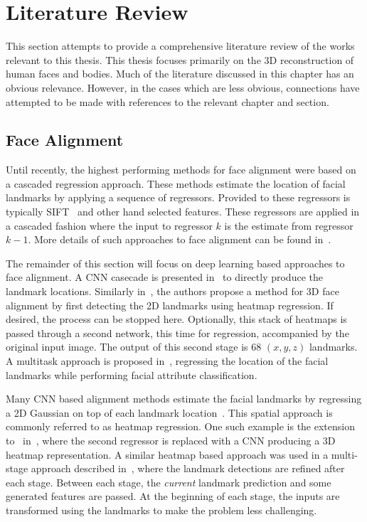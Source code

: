  \chapter{Literature Review}


This section attempts to provide a comprehensive literature review of
the works relevant to this thesis. This thesis focuses primarily on
the 3D reconstruction of human faces and bodies. Much of the
literature discussed in this chapter has an obvious
relevance. However, in the cases which are less obvious, connections
have attempted to be made with references to the relevant chapter and
section.

\section{Face Alignment}

Until recently, the highest performing methods for face alignment were
based on a cascaded regression approach. These methods estimate the
location of facial landmarks by applying a sequence of
regressors. Provided to these regressors is typically
SIFT~\cite{lowe2004distinctive} and other hand selected
features. These regressors are applied in a cascaded fashion where the
input to regressor $k$ is the estimate from regressor $k-1$. More
details of such approaches to face alignment can be found
in~\cite{sanchez16,cao2014facewarehouse,xiongsupervised,zhu2015face,tzimiropoulos2015project}.

The remainder of this section will focus on deep learning based
approaches to face alignment. A CNN casecade is presented
in~\cite{sun2013deep} to directly produce the landmark
locations. Similarly in~\cite{bulat2016two}, the authors propose a
method for 3D face alignment by first detecting the 2D landmarks using
heatmap regression. If desired, the process can be stopped
here. Optionally, this stack of heatmaps is passed through a second
network, this time for regression, accompanied by the original input
image. The output of this second stage is 68 $(x, y, z)$
landmarks. A multitask approach is proposed in~\cite{zhang2014facial},
regressing the location of the facial landmarks while performing
facial attribute classification.

Many CNN based alignment methods estimate the facial landmarks by
regressing a 2D Gaussian on top of each landmark
location~\cite{bulat2016two,bulat2017far,mahpod2018facial,kowalski2017deep,merget2018robust}.
This spatial approach is commonly referred to as heatmap
regression. One such example is the extension to~\cite{bulat2016two}
in~\cite{bulat2017far}, where the second regressor is replaced with a
CNN producing a 3D heatmap representation. A similar heatmap based
approach was used in a multi-stage approach described
in~\cite{kowalski2017deep}, where the landmark detections are refined
after each stage. Between each stage, the \textit{current} landmark
prediction and some generated features are passed. At the beginning of
each stage, the inputs are transformed using the landmarks to make the
problem less challenging.

